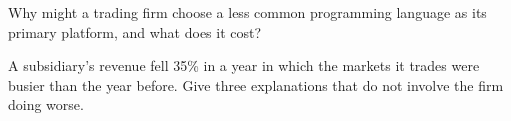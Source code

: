 \begin{interviewq}\label{iq:in:proprietary-market-makers-and-high-frequency-firms:5}
Why might a trading firm choose a less common programming language as its primary platform, and what does it cost?
\end{interviewq}

\begin{interviewq}\label{iq:in:proprietary-market-makers-and-high-frequency-firms:6}
A subsidiary's revenue fell 35\% in a year in which the markets it trades were busier than the year before. Give three
explanations that do not involve the firm doing worse.
\end{interviewq}

